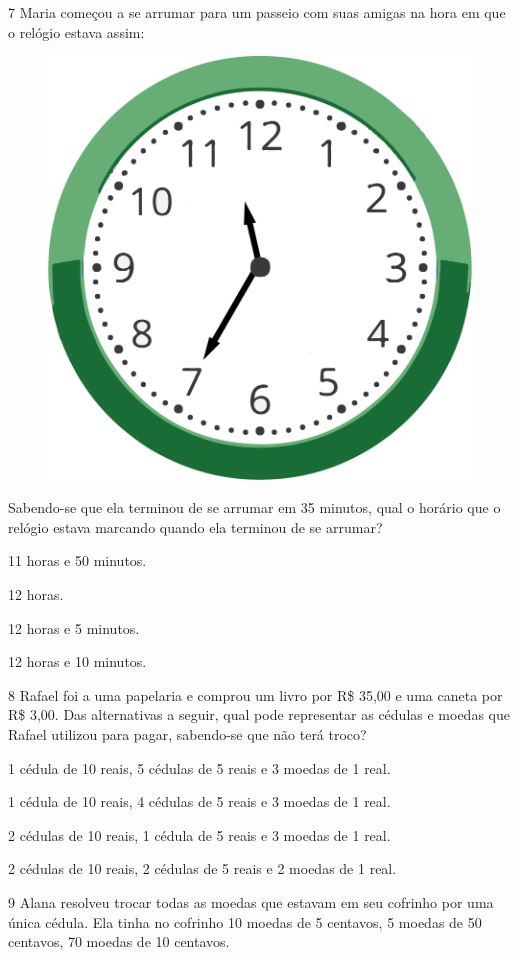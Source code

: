 \num{7} Maria começou a se arrumar para um passeio com suas amigas na hora em que o relógio estava assim:

\begin{figure}[htpb!]
\centering
\includegraphics[width=.5\textwidth]{./media/image116.png}
\end{figure}

\pagebreak
Sabendo-se que ela terminou de se arrumar em 35 minutos, qual o horário que o relógio estava marcando quando ela terminou de se arrumar?

\begin{escolha}
\item
  11 horas e 50 minutos.
\item
  12 horas.
\item
  12 horas e 5 minutos.
\item
  12 horas e 10 minutos.
\end{escolha}


\num{8} Rafael foi a uma papelaria e comprou um livro por R\$ 35,00 e uma caneta
por R\$ 3,00. Das alternativas a seguir, qual pode representar as cédulas
e moedas que Rafael utilizou para pagar, sabendo-se que não terá troco?

\begin{escolha}

\item
  1 cédula de 10 reais, 5 cédulas de 5 reais e 3 moedas de 1 real.
\item
  1 cédula de 10 reais, 4 cédulas de 5 reais e 3 moedas de 1 real.
\item
  2 cédulas de 10 reais, 1 cédula de 5 reais e 3 moedas de 1 real.
\item
  2 cédulas de 10 reais, 2 cédulas de 5 reais e 2 moedas de 1 real.
\end{escolha}


\num{9} Alana resolveu trocar todas as moedas que estavam em seu cofrinho por uma única cédula. Ela tinha no cofrinho 10 moedas de 5 centavos, 5 moedas de
50 centavos, 70 moedas de 10 centavos.


